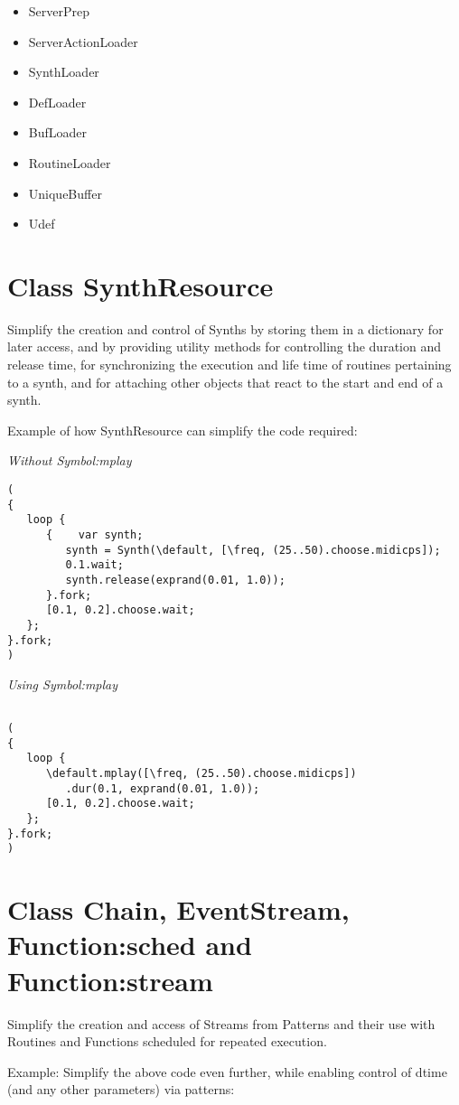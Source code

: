\documentclass[11pt]{article}
\begin{document}
\begin{itemize}
\item ServerPrep
\item ServerActionLoader
\item SynthLoader
\item DefLoader
\item BufLoader
\item RoutineLoader
\item UniqueBuffer
\item Udef
\end{itemize}
\section{Class SynthResource}
\label{sec-3}


Simplify the creation and control of Synths by storing them in a dictionary for later access, and by providing utility methods for
controlling the duration and release time, for synchronizing the execution and life time of routines pertaining to a synth, and for attaching other objects that react to the start and end of a synth.

Example of how SynthResource can simplify the code required: 

\emph{Without Symbol:mplay}

\begin{verbatim}
(
{
   loop {
      {    var synth;
         synth = Synth(\default, [\freq, (25..50).choose.midicps]);
         0.1.wait;
         synth.release(exprand(0.01, 1.0));
      }.fork;
      [0.1, 0.2].choose.wait;
   };
}.fork;
)
\end{verbatim}

\emph{Using Symbol:mplay}

\begin{verbatim}

(
{
   loop {
      \default.mplay([\freq, (25..50).choose.midicps])
         .dur(0.1, exprand(0.01, 1.0));
      [0.1, 0.2].choose.wait;
   };
}.fork;
)
\end{verbatim}
\section{Class Chain, EventStream, Function:sched and Function:stream}
\label{sec-4}


Simplify the creation and access of Streams from Patterns and their use with Routines and Functions scheduled for repeated execution.  

Example: Simplify the above code even further, while enabling  control of dtime (and any other parameters) via patterns:
\end{document}
